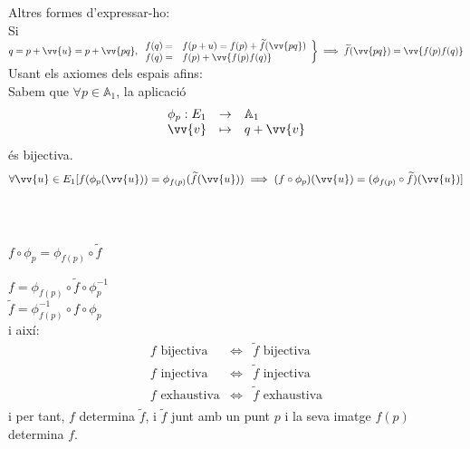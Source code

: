 Altres formes d'expressar-ho: \\
Si $q=p+\vv{u}=p+\vv{pq}, \left.\begin{array}{rl}
	f(q)= & f(p+u)=f(p)+\widetilde{f}(\vv{pq}) \\
	f(q)= & f(p)+\vv{f(p)f(q)} \\
\end{array}\right\}\implies\widetilde{f}(\vv{pq})=\vv{f(p)f(q)}$ \bigskip \\
Usant els axiomes dels espais afins: \\
Sabem que $\forall p\in\mathbb{A}_1$, la aplicació
\[\begin{array}{rcl}
	\phi_{p} :E_1	& \to	& \mathbb{A}_1 	\\
	\vv{v}		& \mapsto		& q+\vv{v}	\\
\end{array}\]
és bijectiva. \\
\[\forall\vv{u}\in E_1[f(\phi_{p}(\vv{u}))=\phi_{f(p)}(\widetilde{f}(\vv{u}))\implies (f\circ\phi_{p})(\vv{u})=(\phi_{f(p)}\circ\widetilde{f})(\vv{u})]\] \\
 \\
$f\circ\phi_p=\phi_{f(p)}\circ\widetilde{f}$
\begin{cor}
	$f=\phi_{f(p)}\circ\widetilde{f}\circ\phi_p^{-1}$ \\
	$\widetilde{f}=\phi_{f(p)}^{-1}\circ f\circ\phi_p$ \\
	i així:
	\[\begin{array}{lcl}
		f\text{ bijectiva} & \iff & \widetilde{f}\text{ bijectiva} \\
		f\text{ injectiva} & \iff & \widetilde{f}\text{ injectiva} \\
		f\text{ exhaustiva} & \iff & \widetilde{f}\text{ exhaustiva} \\
	\end{array}\]
	i per tant, $f$ determina $\widetilde{f}$, i $\widetilde{f}$ junt amb un punt $p$ i la seva imatge $f(p)$ determina $f$.
\end{cor}

